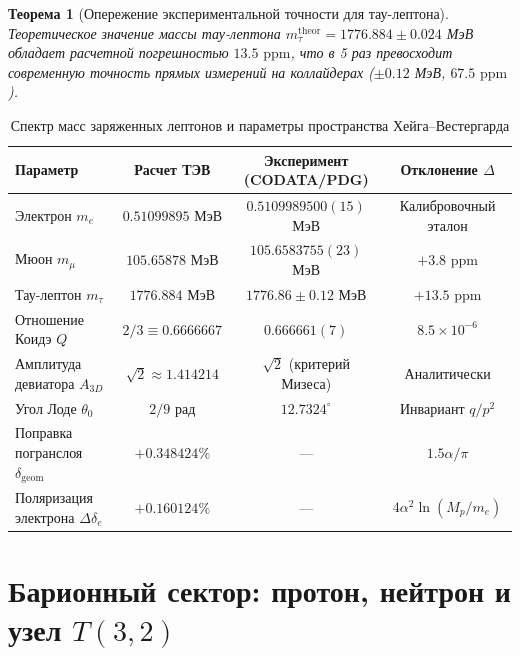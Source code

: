 \documentclass[11pt,a4paper]{article}
\newtheorem{theorem}{Теорема}[section]
\theoremstyle{definition}
\theoremstyle{remark}
\begin{document}
\begin{theorem}[Опережение экспериментальной точности для тау-лептона]
Теоретическое значение массы тау-лептона $m_\tau^{\mathrm{theor}} = 1776.884 \pm 0.024$ МэВ обладает расчетной погрешностью $13.5\text{ ppm}$, что в 5 раз превосходит современную точность прямых измерений на коллайдерах ($\pm 0.12$ МэВ, $67.5\text{ ppm}$).
\end{theorem}

\begin{table}[H]
\centering
\small
\caption{Спектр масс заряженных лептонов и параметры пространства Хейга--Вестергарда}
\label{tab:leptons}
\vspace{2mm}
\begin{tabular}{lccc}
\toprule
\textbf{Параметр} & \textbf{Расчет ТЭВ} & \textbf{Эксперимент (CODATA/PDG)} & \textbf{Отклонение $\Delta$} \\
\midrule
Электрон $m_e$ & $0.51099895$ МэВ & $0.5109989500(15)$ МэВ & Калибровочный эталон \\
Мюон $m_\mu$ & $105.65878$ МэВ & $105.6583755(23)$ МэВ & $+3.8\text{ ppm}$ \\
Тау-лептон $m_\tau$ & $1776.884$ МэВ & $1776.86 \pm 0.12$ МэВ & $+13.5\text{ ppm}$ \\
Отношение Коидэ $Q$ & $2/3 \equiv 0.6666667$ & $0.666661(7)$ & $8.5 \times 10^{-6}$ \\
Амплитуда девиатора $A_{3D}$ & $\sqrt{2} \approx 1.414214$ & $\sqrt{2}$ (критерий Мизеса) & Аналитически \\
Угол Лоде $\theta_0$ & $2/9$ рад & $12.7324^\circ$ & Инвариант $q/p^2$ \\
Поправка погранслоя $\delta_{\mathrm{geom}}$ & $+0.348424\%$ & --- & $1.5\alpha/\pi$ \\
Поляризация электрона $\Delta\delta_e$ & $+0.160124\%$ & --- & $4\alpha^2\ln(M_p/m_e)$ \\
\bottomrule
\end{tabular}
\end{table}


\section{Барионный сектор: протон, нейтрон и узел $T(3,2)$}
\label{sec:baryons}
\end{document}
